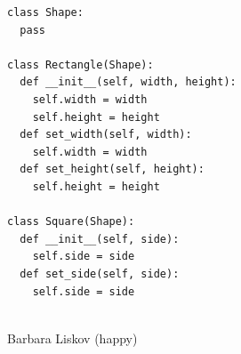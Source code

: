 \documentclass[calcdimensions,landscape,letterpaper]{powersem}
\newcommand{\thecurrentheading}{}
\newcommand{\heading}[1]{\renewcommand{\thecurrentheading}{#1}}
\begin{document}
\begin{slide}
  \heading{Liskov-Substitution - After}
  \begin{center}
    \begin{minipage}[c]{.6\textwidth}
      \begin{verbatim}
class Shape:
  pass

class Rectangle(Shape):
  def __init__(self, width, height):
    self.width = width
    self.height = height
  def set_width(self, width):
    self.width = width
  def set_height(self, height):
    self.height = height

class Square(Shape):
  def __init__(self, side):
    self.side = side
  def set_side(self, side):
    self.side = side
      \end{verbatim}
    \end{minipage}
    \begin{minipage}[c]{.35\textwidth}
      \begin{center}
        \\
        Barbara Liskov (happy)
      \end{center}
    \end{minipage}
  \end{center}
\end{slide}
\end{document}
